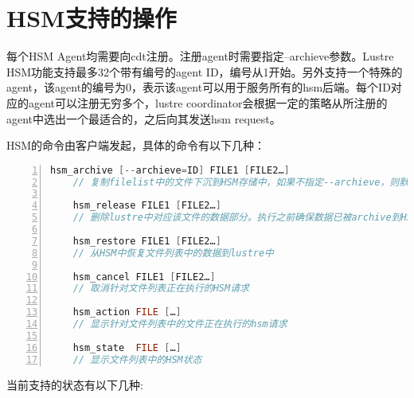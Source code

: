 \section{HSM支持的操作}

每个HSM Agent均需要向cdt注册。注册agent时需要指定--archieve参数。Lustre HSM功能支持最多32个带有编号的agent ID，编号从1开始。另外支持一个特殊的agent，该agent的编号为0，表示该agent可以用于服务所有的hsm后端。每个ID对应的agent可以注册无穷多个，lustre coordinator会根据一定的策略从所注册的agent中选出一个最适合的，之后向其发送hsm request。 

HSM的命令由客户端发起，具体的命令有以下几种： 

\begin{lstlisting}[language={c++},numbers=left]
    hsm_archive [--archieve=ID] FILE1 [FILE2…] 
    // 复制filelist中的文件下沉到HSM存储中，如果不指定--archieve，则默认使用ID=0

    hsm_release FILE1 [FILE2…] 
    // 删除lustre中对应该文件的数据部分。执行之前确保数据已被archive到HSM中

    hsm_restore FILE1 [FILE2…] 
    // 从HSM中恢复文件列表中的数据到lustre中

    hsm_cancel FILE1 [FILE2…] 
    // 取消针对文件列表正在执行的HSM请求
    
    hsm_action FILE […] 
    // 显示针对文件列表中的文件正在执行的hsm请求

    hsm_state  FILE […] 
    // 显示文件列表中的HSM状态
\end{lstlisting}

当前支持的状态有以下几种:
\begin{table}[!htb]
    \centering
    \caption{HSM支持的状态}
    \label{tab:my-table}
\end{table}



